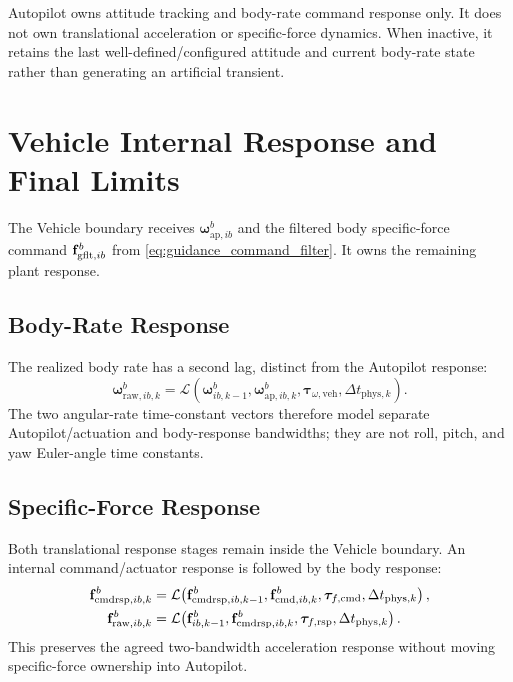 Autopilot owns attitude tracking and body-rate command response only. It does
not own translational acceleration or specific-force dynamics. When inactive,
it retains the last well-defined/configured attitude and current body-rate
state rather than generating an artificial transient.

\section{Vehicle Internal Response and Final Limits}

The Vehicle boundary receives
$\boldsymbol{\omega}_{\mathrm{ap},ib}^{b}$ and the filtered body specific-force
command $\mathbf{f}_{\mathrm{gflt},ib}^{b}$ from
\cref{eq:guidance_command_filter}. It owns the remaining plant response.

\subsection{Body-Rate Response}

The realized body rate has a second lag, distinct from the Autopilot response:
\begin{equation}
\boldsymbol{\omega}_{\mathrm{raw},ib,k}^{b}
=
\mathcal{L}\!\left(
\boldsymbol{\omega}_{ib,k-1}^{b},
\boldsymbol{\omega}_{\mathrm{ap},ib,k}^{b},
\boldsymbol{\tau}_{\omega,\mathrm{veh}},
\Delta t_{\mathrm{phys},k}
\right).
\label{eq:vehicle_rate}
\end{equation}
The two angular-rate time-constant vectors therefore model separate
Autopilot/actuation and body-response bandwidths; they are not roll, pitch, and
yaw Euler-angle time constants.

\subsection{Specific-Force Response}

Both translational response stages remain inside the Vehicle boundary. An
internal command/actuator response is followed by the body response:
\begin{align}
\mathbf{f}_{\mathrm{cmdrsp},ib,k}^{b}
&=
\mathcal{L}\!\left(
\mathbf{f}_{\mathrm{cmdrsp},ib,k-1}^{b},
\mathbf{f}_{\mathrm{cmd},ib,k}^{b},
\boldsymbol{\tau}_{f,\mathrm{cmd}},
\Delta t_{\mathrm{phys},k}
\right),
\label{eq:vehicle_force_actuator}\\
\mathbf{f}_{\mathrm{raw},ib,k}^{b}
&=
\mathcal{L}\!\left(
\mathbf{f}_{ib,k-1}^{b},
\mathbf{f}_{\mathrm{cmdrsp},ib,k}^{b},
\boldsymbol{\tau}_{f,\mathrm{rsp}},
\Delta t_{\mathrm{phys},k}
\right).
\label{eq:vehicle_force_body}
\end{align}
This preserves the agreed two-bandwidth acceleration response without moving
specific-force ownership into Autopilot.

